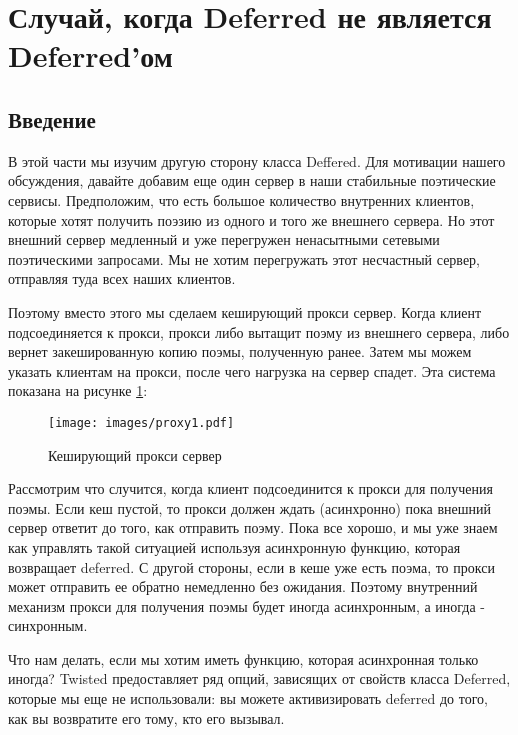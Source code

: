 

\section{Случай, когда Deferred не является Deferred'ом\label{sec:part14}}

\subsection{Введение}


В этой части мы изучим другую сторону класса Deffered. 
Для мотивации нашего обсуждения, давайте добавим еще один сервер в наши 
стабильные поэтические сервисы. Предположим, что есть большое 
количество внутренних клиентов, которые хотят получить поэзию из 
одного и того же внешнего сервера. Но этот внешний сервер медленный 
и уже перегружен ненасытными сетевыми поэтическими запросами. Мы не 
хотим перегружать этот несчастный сервер, отправляя туда всех наших клиентов.  


Поэтому вместо этого мы сделаем кеширующий прокси сервер. Когда 
клиент подсоединяется к прокси, прокси либо вытащит поэму из 
внешнего сервера, либо вернет закешированную копию 
поэмы, полученную ранее. Затем мы можем указать клиентам на прокси, 
после чего нагрузка на сервер спадет. Эта система 
показана на рисунке \ref{fig:proxy1}:

\begin{figure}[h]
\begin{center}
\texttt{[image: images/proxy1.pdf]} 
\caption{Кеширующий прокси сервер}\label{fig:proxy1}
\end{center}
\end{figure}

Рассмотрим что случится, когда клиент подсоединится к 
прокси для получения поэмы. Если кеш пустой, то прокси должен 
ждать (асинхронно) пока внешний сервер ответит до того, как 
отправить поэму. Пока все хорошо, и мы уже знаем как управлять 
такой ситуацией используя асинхронную функцию, которая 
возвращает deferred. С другой стороны, если в кеше уже есть поэма, 
то прокси может отправить ее обратно немедленно без ожидания. 
Поэтому внутренний механизм прокси для получения поэмы 
будет иногда асинхронным, а иногда - синхронным.


Что нам делать, если мы хотим иметь функцию, которая 
асинхронная только иногда? Twisted предоставляет ряд 
опций, зависящих от свойств класса Deferred, 
которые мы еще не использовали: вы можете активизировать 
deferred до того, как вы возвратите его тому, кто его вызывал. 


